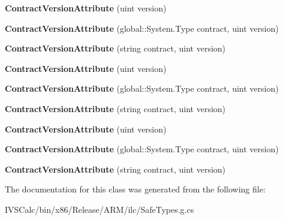 \begin{DoxyCompactItemize}
{\bfseries Contract\+Version\+Attribute} (uint version)
\item 
\mbox{\label{class_windows_1_1_foundation_1_1_metadata_1_1_contract_version_attribute_a3c2c7d8cfa616c262f3e3072fd027062}} 
{\bfseries Contract\+Version\+Attribute} (global\+::\+System.\+Type contract, uint version)
\item 
\mbox{\label{class_windows_1_1_foundation_1_1_metadata_1_1_contract_version_attribute_aeadfde022ee63ebb278af372e32ae41e}} 
{\bfseries Contract\+Version\+Attribute} (string contract, uint version)
\item 
\mbox{\label{class_windows_1_1_foundation_1_1_metadata_1_1_contract_version_attribute_ad93937691fdaf922c37ee5b47345fcf7}} 
{\bfseries Contract\+Version\+Attribute} (uint version)
\item 
\mbox{\label{class_windows_1_1_foundation_1_1_metadata_1_1_contract_version_attribute_a3c2c7d8cfa616c262f3e3072fd027062}} 
{\bfseries Contract\+Version\+Attribute} (global\+::\+System.\+Type contract, uint version)
\item 
\mbox{\label{class_windows_1_1_foundation_1_1_metadata_1_1_contract_version_attribute_aeadfde022ee63ebb278af372e32ae41e}} 
{\bfseries Contract\+Version\+Attribute} (string contract, uint version)
\item 
\mbox{\label{class_windows_1_1_foundation_1_1_metadata_1_1_contract_version_attribute_ad93937691fdaf922c37ee5b47345fcf7}} 
{\bfseries Contract\+Version\+Attribute} (uint version)
\item 
\mbox{\label{class_windows_1_1_foundation_1_1_metadata_1_1_contract_version_attribute_a3c2c7d8cfa616c262f3e3072fd027062}} 
{\bfseries Contract\+Version\+Attribute} (global\+::\+System.\+Type contract, uint version)
\item 
\mbox{\label{class_windows_1_1_foundation_1_1_metadata_1_1_contract_version_attribute_aeadfde022ee63ebb278af372e32ae41e}} 
{\bfseries Contract\+Version\+Attribute} (string contract, uint version)
\end{DoxyCompactItemize}


The documentation for this class was generated from the following file\+:\begin{DoxyCompactItemize}
\item 
I\+V\+S\+Calc/bin/x86/\+Release/\+A\+R\+M/ilc/Safe\+Types.\+g.\+cs\end{DoxyCompactItemize}
